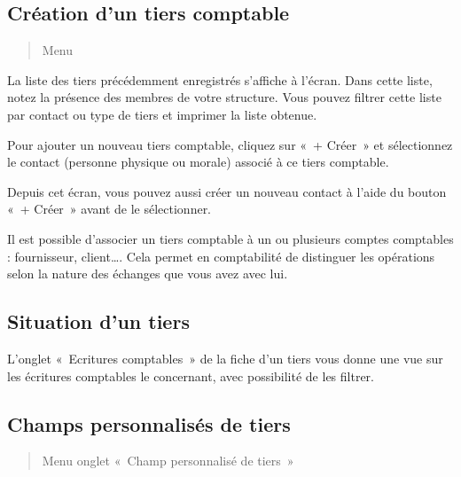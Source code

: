 \documentclass[a4paper,10pt,oneside,french]{sphinxmanual}
\begin{document}
\subsection{Création d’un tiers comptable}
\label{\detokenize{accounting/third:creation-d-un-tiers-comptable}}\begin{quote}

\sphinxAtStartPar
Menu 
\end{quote}

\noindent{}

\sphinxAtStartPar
La liste des tiers précédemment enregistrés s’affiche à l’écran. Dans cette liste, notez la présence des membres de votre structure.
Vous pouvez filtrer cette liste par contact ou type de tiers et imprimer la liste obtenue.

\sphinxAtStartPar
Pour ajouter un nouveau tiers comptable, cliquez sur « + Créer » et sélectionnez le contact (personne physique ou morale) associé à ce tiers comptable.

\noindent{}

\sphinxAtStartPar
Depuis cet écran, vous pouvez aussi créer un nouveau contact à l’aide du bouton « + Créer » avant de le sélectionner.

\noindent{}

\sphinxAtStartPar
Il est possible d’associer un tiers comptable à un ou plusieurs comptes comptables : fournisseur, client…. Cela permet en comptabilité de distinguer les opérations selon la nature des échanges que vous avez avec lui.


\subsection{Situation d’un tiers}
\label{\detokenize{accounting/third:situation-d-un-tiers}}
\sphinxAtStartPar
L’onglet « Ecritures comptables » de la fiche d’un tiers vous donne une vue sur les écritures comptables le concernant,
avec possibilité de les filtrer.

\noindent{}


\subsection{Champs personnalisés de tiers}
\label{\detokenize{accounting/third:champs-personnalises-de-tiers}}\begin{quote}

\sphinxAtStartPar
Menu  \sphinxhyphen{} onglet « Champ personnalisé de tiers »
\end{quote}
\end{document}
